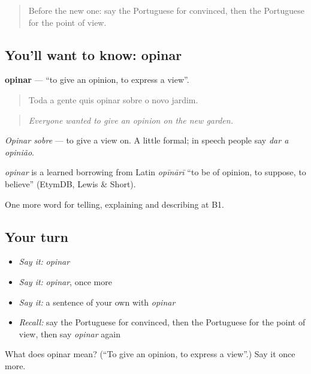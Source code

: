 \begin{quote}
Before the new one: say the Portuguese for convinced, then the Portuguese for the point of view.
\end{quote}

\subsection*{You'll want to know: opinar}
\textbf{opinar} — \textquotedblleft{}to give an opinion, to express a view\textquotedblright{}.

\begin{quote}
Toda a gente quis opinar sobre o novo jardim.
\end{quote}

\begin{quote}
\emph{Everyone wanted to give an opinion on the new garden.}
\end{quote}

\emph{Opinar sobre} — to give a view on. A little formal; in speech people say \emph{dar a opinião}.

\begin{cousinweb}
\emph{opinar} is a learned borrowing from Latin \emph{opīnārī} \textquotedblleft{}to be of opinion, to suppose, to believe\textquotedblright{} (EtymDB, Lewis \& Short).
\end{cousinweb}

\begin{grammarlens}[title={What you've built}]
One more word for telling, explaining and describing at B1.
\end{grammarlens}

\subsection*{Your turn}
\begin{itemize}
\raggedright
  \item \emph{Say it:} \emph{opinar}
  \item \emph{Say it:} \emph{opinar}, once more
  \item \emph{Say it:} a sentence of your own with \emph{opinar}
  \item \emph{Recall:} say the Portuguese for convinced, then the Portuguese for the point of view, then say \emph{opinar} again
\end{itemize}

\begin{tcolorbox}[breakable,colback=teal!4,colframe=teal!35!black,title={Before you move on}]
What does opinar mean? (\textquotedblleft{}To give an opinion, to express a view\textquotedblright{}.) Say it once more.
\end{tcolorbox}
